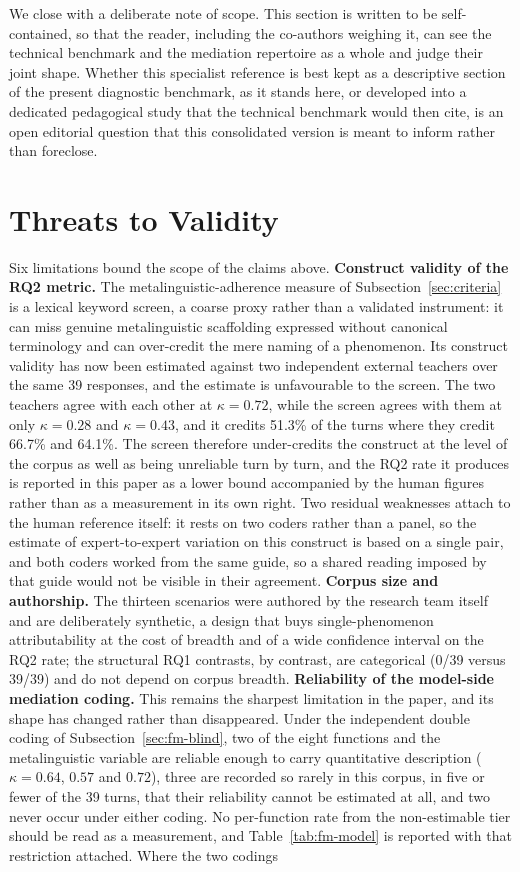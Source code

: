 \documentclass{sbc2023}%
\begin{document}
We close with a deliberate note of scope. This section is written to be self-contained, so that the reader, including the co-authors weighing it, can see the technical benchmark and the mediation repertoire as a whole and judge their joint shape. Whether this specialist reference is best kept as a descriptive section of the present diagnostic benchmark, as it stands here, or developed into a dedicated pedagogical study that the technical benchmark would then cite, is an open editorial question that this consolidated version is meant to inform rather than foreclose.

\section{Threats to Validity}
\label{sec:threats}

Six limitations bound the scope of the claims above. \textbf{Construct validity of the RQ2 metric.} The metalinguistic-adherence measure of Subsection~\ref{sec:criteria} is a lexical keyword screen, a coarse proxy rather than a validated instrument: it can miss genuine metalinguistic scaffolding expressed without canonical terminology and can over-credit the mere naming of a phenomenon. Its construct validity has now been estimated against two independent external teachers over the same 39 responses, and the estimate is unfavourable to the screen. The two teachers agree with each other at $\kappa = 0.72$, while the screen agrees with them at only $\kappa = 0.28$ and $\kappa = 0.43$, and it credits 51.3\% of the turns where they credit 66.7\% and 64.1\%. The screen therefore under-credits the construct at the level of the corpus as well as being unreliable turn by turn, and the RQ2 rate it produces is reported in this paper as a lower bound accompanied by the human figures rather than as a measurement in its own right. Two residual weaknesses attach to the human reference itself: it rests on two coders rather than a panel, so the estimate of expert-to-expert variation on this construct is based on a single pair, and both coders worked from the same guide, so a shared reading imposed by that guide would not be visible in their agreement. \textbf{Corpus size and authorship.} The thirteen scenarios were authored by the research team itself and are deliberately synthetic, a design that buys single-phenomenon attributability at the cost of breadth and of a wide confidence interval on the RQ2 rate; the structural RQ1 contrasts, by contrast, are categorical (0/39 versus 39/39) and do not depend on corpus breadth. \textbf{Reliability of the model-side mediation coding.} This remains the sharpest limitation in the paper, and its shape has changed rather than disappeared. Under the independent double coding of Subsection~\ref{sec:fm-blind}, two of the eight functions and the metalinguistic variable are reliable enough to carry quantitative description ($\kappa = 0.64$, $0.57$ and $0.72$), three are recorded so rarely in this corpus, in five or fewer of the 39 turns, that their reliability cannot be estimated at all, and two never occur under either coding. No per-function rate from the non-estimable tier should be read as a measurement, and Table~\ref{tab:fm-model} is reported with that restriction attached. Where the two codings 
\end{document}
